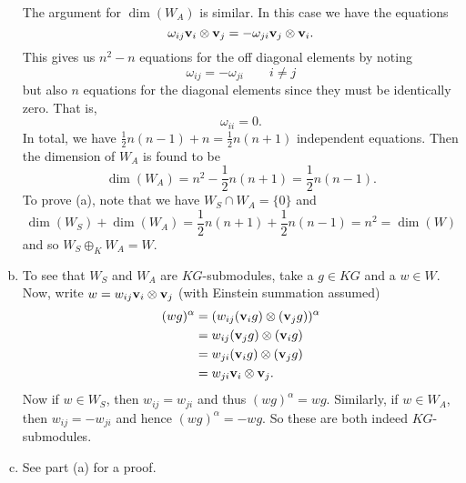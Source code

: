 \documentclass[leqno]{article}
\begin{document}
\begin{solution}
\begin{enumerate}[(a)]
    The argument for $\dim(W_A)$ is similar.  In this case we have the equations
    \[
    \omega_{ij} \mathbf{v}_i \otimes \mathbf{v}_j = -\omega_{ji} \mathbf{v}_j \otimes \mathbf{v}_i.
    \]
    This gives us $n^2-n$ equations for the off diagonal elements by noting
    \[
    \omega_{ij}=-\omega_{ji} \qquad i\neq j
    \]
    but also $n$ equations for the diagonal elements since they must be identically zero.  That is,
    \[
    \omega_{ii}=0.
    \]
    In total, we have $\frac{1}{2}n(n-1)+n=\frac{1}{2}n(n+1)$ independent equations. Then the dimension of $W_A$ is found to be
    \[
    \dim(W_A)=n^2-\frac{1}{2}n(n+1)=\frac{1}{2}n(n-1).
    \]
    To prove (a), note that we have $W_S\cap W_A=\{0\}$ and \[
    \dim(W_S)+\dim(W_A)=\frac{1}{2}n(n+1)+\frac{1}{2}n(n-1)=n^2=\dim(W)
    \]
    and so $W_S\oplus_K W_A=W$.
    \item To see that $W_S$ and $W_A$ are $KG$-submodules, take a $g\in KG$ and a $w\in W$.  Now, write $w=w_{ij}\mathbf{v}_i\otimes \mathbf{v}_j$ (with Einstein summation assumed)
    \begin{align*}
        (wg)^\alpha &= (w_{ij}(\mathbf{v}_ig)\otimes (\mathbf{v}_j g))^\alpha\\
        &= w_{ij}(\mathbf{v}_j g)\otimes (\mathbf{v}_i g)\\
        &= w_{ji}(\mathbf{v}_ig)\otimes (\mathbf{v}_j g)\\
        &= w_{ji}\mathbf{v}_i \otimes \mathbf{v}_j.
    \end{align*}
    Now if $w\in W_S$, then $w_{ij}=w_{ji}$ and thus $(wg)^\alpha=wg$. Similarly, if $w\in W_A$, then $w_{ij}=-w_{ji}$ and hence $(wg)^\alpha = -wg$. So these are both indeed $KG$-submodules.
    \item See part (a) for a proof.
\end{enumerate}
\end{solution}
\end{document}
